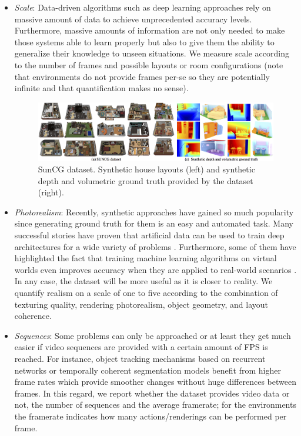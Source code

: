 \begin{itemize}
  \item \emph{Scale}: Data-driven algorithms such as deep learning approaches rely on massive amount of data to achieve unprecedented accuracy levels. Furthermore, massive amounts of information are not only needed to make those systems able to learn properly but also to give them the ability to generalize their knowledge to unseen situations. We measure scale according to the number of frames and possible layouts or room configurations (note that environments do not provide frames per-se so they are potentially infinite and that quantification makes no sense).
  \begin{figure}
    \centering
    \includegraphics[width=\linewidth, clip, trim=0 20 0 0]{Figures/Sim2Real/suncg}
    \caption{SunCG dataset. Synthetic house layouts (left) and synthetic depth and volumetric ground truth provided by the dataset (right).}
    \label{fig:sim2real:suncg}
  \end{figure}
  \item \emph{Photorealism}: Recently, synthetic approaches have gained so much popularity since generating ground truth for them is an easy and automated task. Many successful stories have proven that artificial data can be used to train deep architectures for a wide variety of problems \cite{Ros2016,Lin2016,Mahendran2016,Jiang2017,Mueller2017,Zhang16}. Furthermore, some of them have highlighted the fact that training machine learning algorithms on virtual worlds even improves accuracy when they are applied to real-world scenarios \cite{Johnson-Roberson2016} \cite{Tobin2017}. In any case, the dataset will be more useful as it is closer to reality. We quantify realism on a scale of one to five according to the combination of texturing quality, rendering photorealism, object geometry, and layout coherence.
  \item \emph{Sequences}: Some problems can only be approached or at least they get much easier if video sequences are provided with a certain amount of \ac{FPS} is reached. For instance, object tracking mechanisms based on recurrent networks \cite{Held2016} or temporally coherent segmentation models \cite{Shelhamer2016} benefit from higher frame rates which provide smoother changes without huge differences between frames. In this regard, we report whether the dataset provides video data or not, the number of sequences and the average framerate; for the environments the framerate indicates how many actions/renderings can be performed per frame.

\end{itemize}

